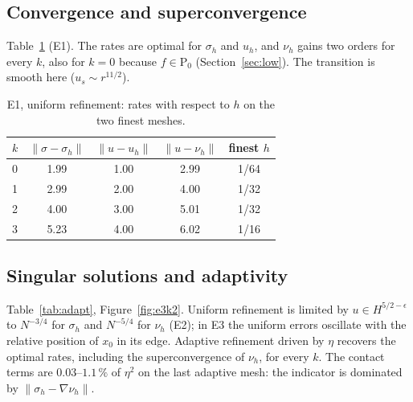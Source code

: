 \documentclass[11pt,a4paper]{article}
\theoremstyle{definition}
\newcommand{\Pk}[1]{\mathrm{P}_{#1}}
\begin{document}
\subsection{Convergence and superconvergence}\label{sec:conv}

Table~\ref{tab:e1} (E1). The rates are optimal for $\sigma_h$ and $u_h$, and $\nu_h$ gains two
orders for every $k$, also for $k=0$ because $f\in\Pk0$ (Section~\ref{sec:low}). The transition is
smooth here ($u_s\sim r^{11/2}$).

\begin{table}[htbp]
\centering\small
\begin{tabular}{@{}lcccc@{}}
\toprule
$k$ & $\|\sigma-\sigma_h\|$ & $\|u-u_h\|$ & $\|u-\nu_h\|$ & finest $h$ \\
\midrule
0 & 1.99 & 1.00 & 2.99 & 1/64 \\
1 & 2.99 & 2.00 & 4.00 & 1/32 \\
2 & 4.00 & 3.00 & 5.01 & 1/32 \\
3 & 5.23 & 4.00 & 6.02 & 1/16 \\
\bottomrule
\end{tabular}
\caption{E1, uniform refinement: rates with respect to $h$ on the two finest meshes.}
\label{tab:e1}
\end{table}

\subsection{Singular solutions and adaptivity}\label{sec:adapt}

Table~\ref{tab:adapt}, Figure~\ref{fig:e3k2}. Uniform refinement is limited by
$u\in H^{5/2-\epsilon}$ to $N^{-3/4}$ for $\sigma_h$ and $N^{-5/4}$ for $\nu_h$ (E2); in E3 the
uniform errors oscillate with the relative position of $x_0$ in its edge. Adaptive refinement driven
by $\eta$ recovers the optimal rates, including the superconvergence of $\nu_h$, for every $k$. The
contact terms are $0.03$--$1.1\,\%$ of $\eta^2$ on the last adaptive mesh: the indicator is
dominated by $\|\sigma_h-\nabla\nu_h\|$.
\end{document}
